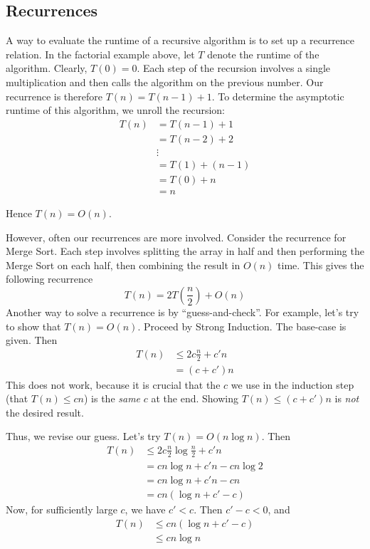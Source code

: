 \documentclass[a4paper]{article}
\theoremstyle{definition}
\begin{document}
\subsection{Recurrences}
A way to evaluate the runtime of a recursive algorithm is to set up a recurrence relation. In the factorial example above, let $T$ denote the runtime of the algorithm. Clearly, $T(0)=0$. Each step of the recursion involves a single multiplication and then calls the algorithm on the previous number. Our recurrence is therefore $T(n)=T(n-1)+1$. To determine the asymptotic runtime of this algorithm, we unroll the recursion:
\begin{align*}
T(n)&=T(n-1)+1\\
    &=T(n-2)+2\\
    &\vdots\\
    &=T(1) + (n-1)\\
    &=T(0)+n\\&=n
\end{align*}

Hence $T(n)=O(n)$. 

However, often our recurrences are more involved. Consider the recurrence for Merge Sort. Each step involves splitting the array in half and then performing the Merge Sort on each half, then combining the result in $O(n)$ time. This gives the following recurrence \[T(n)=2T\left(\frac{n}{2}\right)+O(n)\] Another way to solve a recurrence is by ``guess-and-check''. For example, let's try to show that $T(n)=O(n)$. Proceed by Strong Induction. The base-case is given. Then \begin{align*}T(n)&\leq2c\frac{n}{2}+c'n\\&=(c+c')n\end{align*} This does not work, because it is crucial that the $c$ we use in the induction step (that $T(n)\leq cn$) is the \textit{same} $c$ at the end. Showing $T(n)\leq(c+c')n$ is \textit{not} the desired result.

Thus, we revise our guess. Let's try $T(n)=O(n\log{n})$. Then 
\begin{align*}
T(n)&\leq2c\frac{n}{2}\log{\frac{n}{2}}+c'n\\
    &=cn\log{n}+c'n-cn\log{2}\\
    &=cn\log{n}+c'n-cn\\
    &=cn\left(\log{n}+c'-c\right)
\end{align*}
Now, for sufficiently large $c$, we have $c'<c$. Then $c'-c<0$, and
\begin{align*}
T(n)&\leq cn\left(\log{n}+c'-c\right)\\
    &\leq cn\log{n}
\end{align*}
\end{document}
